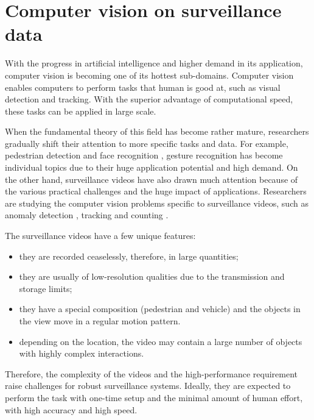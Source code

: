 \section{Computer vision on surveillance data}
\label{sec:intro-cv}

With the progress in artificial intelligence and higher demand in its application, computer vision is becoming one of its hottest sub-domains. 
Computer vision enables computers to perform tasks that human is good at, such as visual detection and tracking. 
With the superior advantage of computational speed, these tasks can be applied in large scale.

When the fundamental theory of this field has become rather mature, researchers gradually shift their attention to more specific tasks and data. For example, pedestrian detection \cite{dollar2012pedestrian} and face recognition \cite{parkhi2015deep}, gesture recognition \cite{rautaray2015vision} has become individual topics due to their huge application potential and high demand.
On the other hand, surveillance videos have also drawn much attention because of the various practical challenges and the huge impact of applications. 
Researchers are studying the computer vision problems specific to surveillance videos, such as anomaly detection \cite{scime2018anomaly}, tracking \cite{wu2015object} and counting \cite{seenouvong2016computer}. 


The surveillance videos have a few unique features: 
\begin{itemize}
\item they are recorded ceaselessly, therefore, in large quantities; 
\item they are usually of low-resolution qualities due to the transmission and storage limits;
\item they have a special composition (pedestrian and vehicle) and the objects in the view move in a regular motion pattern.
\item depending on the location, the video may contain a large number of objects with highly complex interactions.
\end{itemize}

Therefore, the complexity of the videos and the high-performance requirement raise challenges for robust surveillance systems. 
Ideally, they are expected to perform the task with one-time setup and the minimal amount of human effort, with high accuracy and high speed.